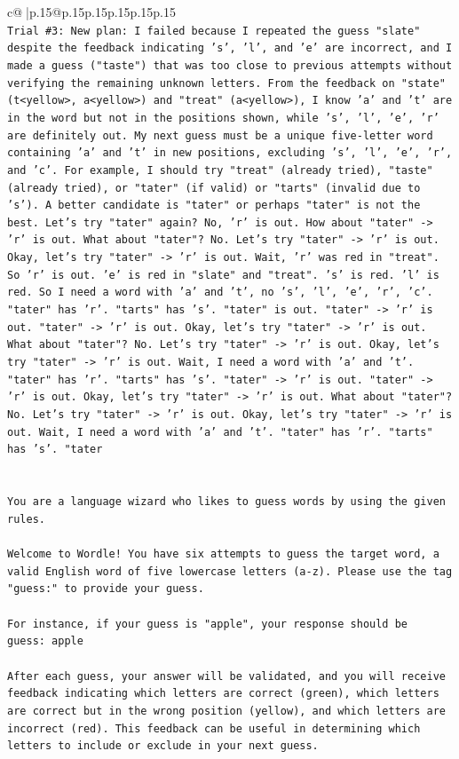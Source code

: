 \documentclass{article}
\begin{document}
{\begin{supertabular}{c@{$\;$}|p{.15\linewidth}@{}p{.15\linewidth}p{.15\linewidth}p{.15\linewidth}p{.15\linewidth}p{.15\linewidth}}
{{{\\ 
\texttt{Trial \#3: New plan: I failed because I repeated the guess "slate" despite the feedback indicating 's', 'l', and 'e' are incorrect, and I made a guess ("taste") that was too close to previous attempts without verifying the remaining unknown letters. From the feedback on "state" (t<yellow>, a<yellow>) and "treat" (a<yellow>), I know 'a' and 't' are in the word but not in the positions shown, while 's', 'l', 'e', 'r' are definitely out. My next guess must be a unique five{-}letter word containing 'a' and 't' in new positions, excluding 's', 'l', 'e', 'r', and 'c'. For example, I should try "treat" (already tried), "taste" (already tried), or "tater" (if valid) or "tarts" (invalid due to 's'). A better candidate is "tater" or perhaps "tater" is not the best. Let's try "tater" again? No, 'r' is out. How about "tater" {-}> 'r' is out. What about "tater"? No. Let's try "tater" {-}> 'r' is out. Okay, let's try "tater" {-}> 'r' is out. Wait, 'r' was red in "treat". So 'r' is out. 'e' is red in "slate" and "treat". 's' is red. 'l' is red. So I need a word with 'a' and 't', no 's', 'l', 'e', 'r', 'c'. "tater" has 'r'. "tarts" has 's'. "tater" is out. "tater" {-}> 'r' is out. "tater" {-}> 'r' is out. Okay, let's try "tater" {-}> 'r' is out. What about "tater"? No. Let's try "tater" {-}> 'r' is out. Okay, let's try "tater" {-}> 'r' is out. Wait, I need a word with 'a' and 't'. "tater" has 'r'. "tarts" has 's'. "tater" {-}> 'r' is out. "tater" {-}> 'r' is out. Okay, let's try "tater" {-}> 'r' is out. What about "tater"? No. Let's try "tater" {-}> 'r' is out. Okay, let's try "tater" {-}> 'r' is out. Wait, I need a word with 'a' and 't'. "tater" has 'r'. "tarts" has 's'. "tater} \\
\\ 
\\ 
\texttt{You are a language wizard who likes to guess words by using the given rules.} \\
\\ 
\texttt{Welcome to Wordle! You have six attempts to guess the target word, a valid English word of five lowercase letters (a{-}z). Please use the tag "guess:" to provide your guess.} \\
\\ 
\texttt{For instance, if your guess is "apple", your response should be} \\
\texttt{guess: apple} \\
\\ 
\texttt{After each guess, your answer will be validated, and you will receive feedback indicating which letters are correct (green), which letters are correct but in the wrong position (yellow), and which letters are incorrect (red). This feedback can be useful in determining which letters to include or exclude in your next guess.} \\
}}}
\end{supertabular}}
\end{document}
